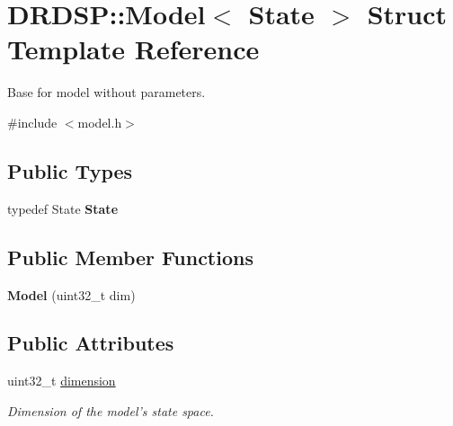 \hypertarget{struct_d_r_d_s_p_1_1_model}{\section{D\-R\-D\-S\-P\-:\-:Model$<$ State $>$ Struct Template Reference}
\label{struct_d_r_d_s_p_1_1_model}
}


Base for model without parameters.  




{\ttfamily \#include $<$model.\-h$>$}

\subsection*{Public Types}
\begin{DoxyCompactItemize}
\item 
\hypertarget{struct_d_r_d_s_p_1_1_model_a30ca6d1a4dbcb6801ccb5a2421cbc434}{typedef State {\bfseries State}}\label{struct_d_r_d_s_p_1_1_model_a30ca6d1a4dbcb6801ccb5a2421cbc434}

\end{DoxyCompactItemize}
\subsection*{Public Member Functions}
\begin{DoxyCompactItemize}
\item 
\hypertarget{struct_d_r_d_s_p_1_1_model_a9b0653f18d73cbb266b26e13bf46e500}{{\bfseries Model} (uint32\-\_\-t dim)}\label{struct_d_r_d_s_p_1_1_model_a9b0653f18d73cbb266b26e13bf46e500}

\end{DoxyCompactItemize}
\subsection*{Public Attributes}
\begin{DoxyCompactItemize}
\item 
\hypertarget{struct_d_r_d_s_p_1_1_model_afad2b55b6940509a05759d223a168841}{uint32\-\_\-t \hyperlink{struct_d_r_d_s_p_1_1_model_afad2b55b6940509a05759d223a168841}{dimension}}\label{struct_d_r_d_s_p_1_1_model_afad2b55b6940509a05759d223a168841}

\begin{DoxyCompactList}\small\item\em Dimension of the model's state space. \end{DoxyCompactList}\end{DoxyCompactItemize}


